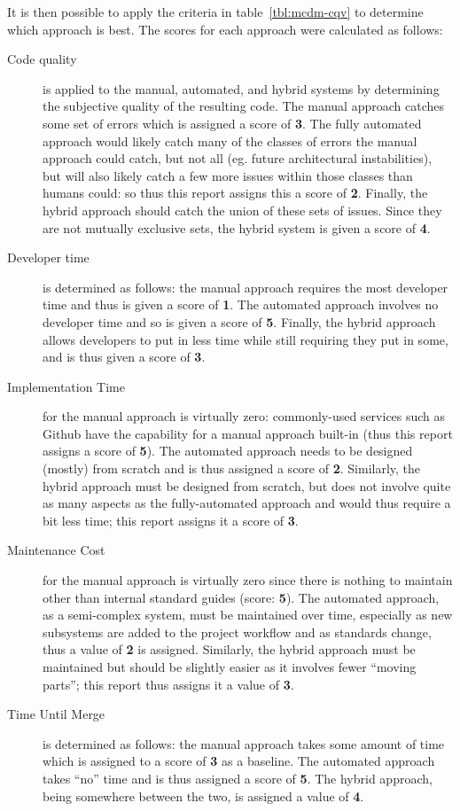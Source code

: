 \documentclass[12pt]{article}
\begin{document}
It is then possible to apply the criteria in table~\ref{tbl:mcdm-cqv} to determine which approach is best. The scores for each approach were calculated as follows:
\begin{description}
\item[Code quality] is applied to the manual, automated, and hybrid systems by determining the subjective quality of the resulting code. The manual approach catches some set of errors which is assigned a score of {\bf 3}. The fully automated approach would likely catch many of the classes of errors the manual approach could catch, but not all (eg. future architectural instabilities), but will also likely catch a few more issues within those classes than humans could: so thus this report assigns this a score of {\bf 2}. Finally, the hybrid approach should catch the union of these sets of issues. Since they are not mutually exclusive sets, the hybrid system is given a score of {\bf 4}.
\item[Developer time] is determined as follows: the manual approach requires the most developer time and thus is given a score of {\bf 1}. The automated approach involves no developer time and so is given a score of {\bf 5}. Finally, the hybrid approach allows developers to put in less time while still requiring they put in some, and is thus given a score of {\bf 3}.
\item[Implementation Time] for the manual approach is virtually zero: commonly-used services such as Github have the capability for a manual approach built-in (thus this report assigns a score of {\bf 5}). The automated approach needs to be designed (mostly) from scratch and is thus assigned a score of {\bf 2}. Similarly, the hybrid approach must be designed from scratch, but does not involve quite as many aspects as the fully-automated approach and would thus require a bit less time; this report assigns it a score of {\bf 3}.
\item[Maintenance Cost] for the manual approach is virtually zero since there is nothing to maintain other than internal standard guides (score: {\bf 5}). The automated approach, as a semi-complex system, must be maintained over time, especially as new subsystems are added to the project workflow and as standards change, thus a value of {\bf 2} is assigned. Similarly, the hybrid approach must be maintained but should be slightly easier as it involves fewer ``moving parts''; this report thus assigns it a value of {\bf 3}.
\item[Time Until Merge] is determined as follows: the manual approach takes some amount of time which is assigned to a score of {\bf 3} as a baseline. The automated approach takes ``no'' time and is thus assigned a score of {\bf 5}. The hybrid approach, being somewhere between the two, is assigned a value of {\bf 4}.
\end{description}
\end{document}
